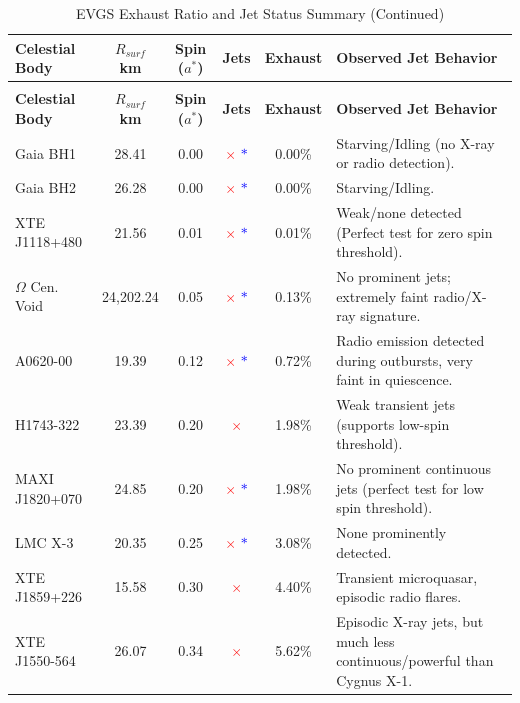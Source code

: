 \documentclass[11pt, a4paper]{article}
\begin{document}
\begin{landscape}
\setlength{\tabcolsep}{4pt} %
\begin{longtable}[l]{@{} l c c c c p{14cm} @{}} %
  \caption{EVGS Exhaust Ratio and Jet Status Summary} \\
  \toprule
  \textbf{Celestial Body} & \textbf{$R_{surf}$ km} & \textbf{Spin ($a^*$)} & \textbf{Jets} & \textbf{Exhaust} & \textbf{Observed Jet Behavior} \\
  \midrule
  \endfirsthead
  \caption[]{EVGS Exhaust Ratio and Jet Status Summary (Continued)} \\
  \toprule
  \textbf{Celestial Body} & \textbf{$R_{surf}$ km} & \textbf{Spin ($a^*$)} & \textbf{Jets} & \textbf{Exhaust} & \textbf{Observed Jet Behavior} \\
  \midrule
  \endhead
  \bottomrule
  \endfoot
  Gaia BH1 & 28.41 & 0.00 & \textcolor{red}{\Large $\times$} \textcolor{blue}{\Large $*$} & 0.00\% & Starving/Idling (no X-ray or radio detection). \\
  Gaia BH2 & 26.28 & 0.00 & \textcolor{red}{\Large $\times$} \textcolor{blue}{\Large $*$} & 0.00\% & Starving/Idling. \\
  XTE J1118+480 & 21.56 & 0.01 & \textcolor{red}{\Large $\times$} \textcolor{blue}{\Large $*$} & 0.01\% & Weak/none detected (Perfect test for zero spin threshold). \\
  $\Omega$ Cen. Void & 24,202.24 & 0.05 & \textcolor{red}{\Large $\times$} \textcolor{blue}{\Large $*$} & 0.13\% & No prominent jets; extremely faint radio/X-ray signature. \\
  A0620-00 & 19.39 & 0.12 & \textcolor{red}{\Large $\times$} \textcolor{blue}{\Large $*$} & 0.72\% & Radio emission detected during outbursts, very faint in quiescence. \\
  H1743-322 & 23.39 & 0.20 & \textcolor{red}{\Large $\times$} & 1.98\% & Weak transient jets (supports low-spin threshold). \\
  MAXI J1820+070 & 24.85 & 0.20 & \textcolor{red}{\Large $\times$} \textcolor{blue}{\Large $*$} & 1.98\% & No prominent continuous jets (perfect test for low spin threshold). \\
  LMC X-3 & 20.35 & 0.25 & \textcolor{red}{\Large $\times$} \textcolor{blue}{\Large $*$} & 3.08\% & None prominently detected. \\
  XTE J1859+226 & 15.58 & 0.30 & \textcolor{red}{\Large $\times$} & 4.40\% & Transient microquasar, episodic radio flares. \\
  XTE J1550-564 & 26.07 & 0.34 & \textcolor{red}{\Large $\times$} & 5.62\% & Episodic X-ray jets, but much less continuous/powerful than Cygnus X-1. \\

\end{longtable}
\end{landscape}
\end{document}
